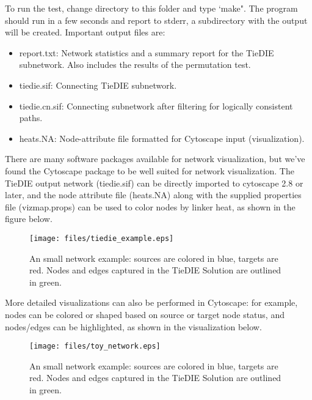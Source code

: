 \documentclass[11pt]{report}
\begin{document}
\noindent To run the test, change directory to this folder and type `make". The program should run in a few seconds and report 
to stderr, a subdirectory with the output will be created. Important output files are:

	\begin{itemize}
	\item report.txt: Network statistics and a summary report for the TieDIE subnetwork. Also includes the results of the 
	permutation test. 
	\item tiedie.sif: Connecting TieDIE subnetwork.
	\item tiedie.cn.sif: Connecting subnetwork after filtering for logically consistent paths. 
	\item heats.NA: Node-attribute file formatted for Cytoscape input (visualization). 
	\end{itemize}

\noindent There are many software packages available for network visualization, but we've found the Cytoscape package \cite{Cytoscape03} to be well suited for network visualization. The TieDIE output network (tiedie.sif) can be directly imported to cytoscape 2.8 or later, and the node attribute file (heats.NA) along with the supplied properties file (vizmap.props) can be used to color nodes by linker heat, as shown in the figure below.

\begin{figure}[h]
    \texttt{[image: files/tiedie\_example.eps]}
	\caption{An small network example: sources are colored in blue, targets are red. Nodes and edges captured in the TieDIE Solution are outlined in green.}
    \label{fig:toy_network}
\end{figure}

\clearpage

More detailed visualizations can also be performed in Cytoscape: for example, nodes can be colored or shaped based on source or
target node status, and nodes/edges can be highlighted, as shown in the visualization below. 

\begin{figure}[h]
    \texttt{[image: files/toy\_network.eps]}
	\caption{An small network example: sources are colored in blue, targets are red. Nodes and edges captured in the TieDIE Solution are outlined in green.}
    \label{fig:toy_network}
\end{figure}


\end{document}
